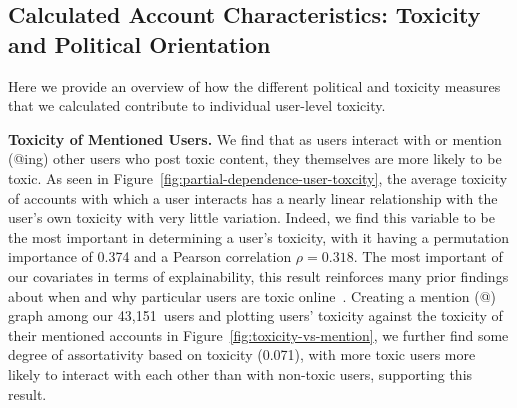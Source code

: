 \subsection{Calculated Account Characteristics: Toxicity and Political Orientation\label{sec:calculated}}

Here we provide an overview of how the different political and toxicity measures that we calculated contribute to individual user-level toxicity. 

\vspace{2pt}\noindent
\noindent
\textbf{Toxicity of Mentioned Users.} We find that as users interact with or mention (@ing) other users who post toxic content, they themselves are more likely to be toxic. As seen in Figure~\ref{fig:partial-dependence-user-toxcity}, the average toxicity of accounts with which a user interacts has a nearly linear relationship with the user's own toxicity with very little variation. Indeed, we find this variable to be the most important in determining a user's toxicity, with it having a permutation importance of 0.374 and a Pearson correlation $\rho=0.318$. The most important of our covariates in terms of explainability, this result reinforces many prior findings about when and why particular users are toxic online~\cite{saveski2021structure,rajadesingan2020quick}. Creating a mention (@) graph among our 43,151~users and plotting users' toxicity against the toxicity of their mentioned accounts in Figure~\ref{fig:toxicity-vs-mention}, we further find some degree of assortativity based on toxicity (0.071), with more toxic users more likely to interact with each other than with non-toxic users, supporting this result. 



